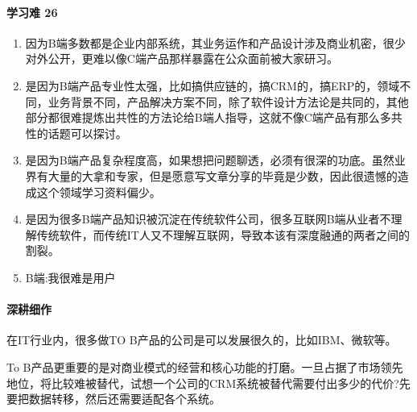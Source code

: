 \documentclass[letterpaper,11pt,english]{sphinxmanual}
\begin{document}
\paragraph{学习难 26\sphinxfootnotemark[53]}
\label{\detokenize{chapter_introduction/2B:id18}}%
\begin{footnotetext}[53]\sphinxAtStartFootnote
{}
%
\end{footnotetext}\ignorespaces \begin{enumerate}
%
\item {} 
因为B端多数都是企业内部系统，其业务运作和产品设计涉及商业机密，很少对外公开，更难以像C端产品那样暴露在公众面前被大家研习。

\item {} 
是因为B端产品专业性太强，比如搞供应链的，搞CRM的，搞ERP的，领域不同，业务背景不同，产品解决方案不同，除了软件设计方法论是共同的，其他部分都很难提炼出共性的方法论给B端人指导，这就不像C端产品有那么多共性的话题可以探讨。

\item {} 
是因为B端产品复杂程度高，如果想把问题聊透，必须有很深的功底。虽然业界有大量的大拿和专家，但是愿意写文章分享的毕竟是少数，因此很遗憾的造成这个领域学习资料偏少。

\item {} 
是因为很多B端产品知识被沉淀在传统软件公司，很多互联网B端从业者不理解传统软件，而传统IT人又不理解互联网，导致本该有深度融通的两者之间的割裂。

\item {} 
B端:我很难是用户

\end{enumerate}


\paragraph{深耕细作}
\label{\detokenize{chapter_introduction/2B:id19}}
在IT行业内，很多做TO
B产品的公司是可以发展很久的，比如IBM、微软等。%
\begin{footnote}[54]\sphinxAtStartFootnote
{}
%
\end{footnote}

To
B产品更重要的是对商业模式的经营和核心功能的打磨。一旦占据了市场领先地位，将比较难被替代，试想一个公司的CRM系统被替代需要付出多少的代价?先要把数据转移，然后还需要适配各个系统。
\end{document}
